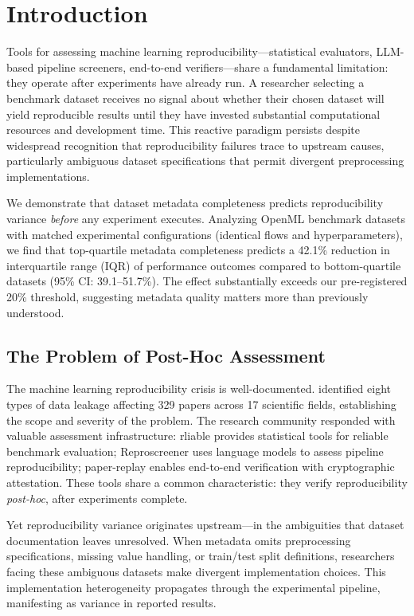 \section{Introduction}

Tools for assessing machine learning reproducibility---statistical evaluators, LLM-based pipeline screeners, end-to-end verifiers---share a fundamental limitation: they operate after experiments have already run. A researcher selecting a benchmark dataset receives no signal about whether their chosen dataset will yield reproducible results until they have invested substantial computational resources and development time. This reactive paradigm persists despite widespread recognition that reproducibility failures trace to upstream causes, particularly ambiguous dataset specifications that permit divergent preprocessing implementations.

We demonstrate that dataset metadata completeness predicts reproducibility variance \emph{before} any experiment executes. Analyzing OpenML benchmark datasets with matched experimental configurations (identical flows and hyperparameters), we find that top-quartile metadata completeness predicts a 42.1\% reduction in interquartile range (IQR) of performance outcomes compared to bottom-quartile datasets (95\% CI: 39.1--51.7\%). The effect substantially exceeds our pre-registered 20\% threshold, suggesting metadata quality matters more than previously understood.

\subsection{The Problem of Post-Hoc Assessment}

The machine learning reproducibility crisis is well-documented. \citet{kapoor2022leakage} identified eight types of data leakage affecting 329 papers across 17 scientific fields, establishing the scope and severity of the problem. The research community responded with valuable assessment infrastructure: rliable \citep{agarwal2021deep} provides statistical tools for reliable benchmark evaluation; Reproscreener \citep{bhaskar2024reproscreener} uses language models to assess pipeline reproducibility; paper-replay enables end-to-end verification with cryptographic attestation. These tools share a common characteristic: they verify reproducibility \emph{post-hoc}, after experiments complete.

Yet reproducibility variance originates upstream---in the ambiguities that dataset documentation leaves unresolved. When metadata omits preprocessing specifications, missing value handling, or train/test split definitions, researchers facing these ambiguous datasets make divergent implementation choices. This implementation heterogeneity propagates through the experimental pipeline, manifesting as variance in reported results.

